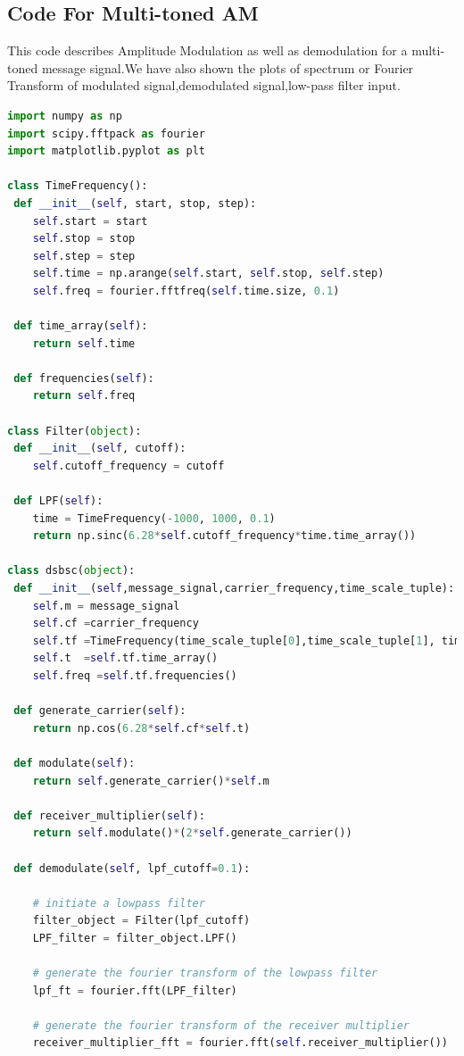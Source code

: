 \documentclass[12pt,a4paper]{article}%
\begin{document}
    	\subsection{Code For Multi-toned AM}
    \begin{flushleft}This code  describes Amplitude Modulation as well as demodulation for a multi-toned message signal.We have also shown the plots of spectrum or Fourier Transform of modulated signal,demodulated signal,low-pass filter input.
    	\lstset{numbers=none,breaklines=true,} 
    	\begin{lstlisting}[language=python]
import numpy as np
import scipy.fftpack as fourier
import matplotlib.pyplot as plt

class TimeFrequency():
 def __init__(self, start, stop, step):
	self.start = start
	self.stop = stop
	self.step = step
	self.time = np.arange(self.start, self.stop, self.step)
	self.freq = fourier.fftfreq(self.time.size, 0.1)

 def time_array(self):
	return self.time

 def frequencies(self):
	return self.freq

class Filter(object):
 def __init__(self, cutoff):
	self.cutoff_frequency = cutoff

 def LPF(self):
	time = TimeFrequency(-1000, 1000, 0.1)
	return np.sinc(6.28*self.cutoff_frequency*time.time_array())

class dsbsc(object):
 def __init__(self,message_signal,carrier_frequency,time_scale_tuple):
	self.m = message_signal
	self.cf =carrier_frequency
	self.tf =TimeFrequency(time_scale_tuple[0],time_scale_tuple[1], time_scale_tuple[2])
	self.t  =self.tf.time_array()
	self.freq =self.tf.frequencies()

 def generate_carrier(self):
	return np.cos(6.28*self.cf*self.t)

 def modulate(self):
	return self.generate_carrier()*self.m

 def receiver_multiplier(self):
	return self.modulate()*(2*self.generate_carrier())

 def demodulate(self, lpf_cutoff=0.1):

	# initiate a lowpass filter
	filter_object = Filter(lpf_cutoff)
	LPF_filter = filter_object.LPF()
	
	# generate the fourier transform of the lowpass filter
	lpf_ft = fourier.fft(LPF_filter)
	
	# generate the fourier transform of the receiver multiplier
	receiver_multiplier_fft = fourier.fft(self.receiver_multiplier())
	

\end{lstlisting}
\end{flushleft}
\end{document}
